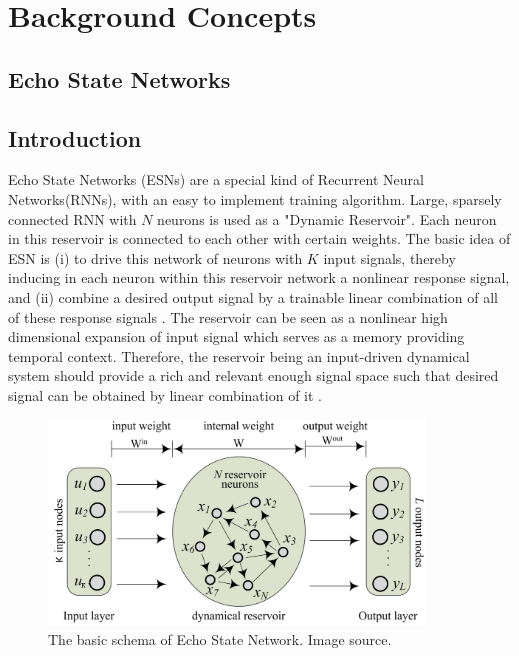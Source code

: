  \section{Background Concepts}
 
 \subsection{Echo State Networks}
  \subsection{Introduction}
  \indent \indent
  
 Echo State Networks (ESNs) are a special kind of Recurrent Neural Networks(RNNs), with an easy to implement training algorithm.
 Large, sparsely connected RNN with $N$ neurons is used as a "Dynamic Reservoir". 
 Each neuron in this reservoir is connected to each other with certain weights. The basic idea of ESN is (i) to drive this network of neurons with $K$ input signals, thereby inducing in each neuron within this reservoir network a nonlinear response signal, and (ii) combine a desired output signal by a trainable linear combination of all of these response signals \cite{Jaeger:2007}. %
 The reservoir can be seen as a nonlinear high dimensional expansion of input signal which serves as a memory providing temporal context. Therefore, the reservoir being an input-driven dynamical system should provide a rich and relevant enough signal space such that desired signal can be obtained by linear combination of it \cite{mantas}.
 \\
 \begin{figure}
	 \centering
	 \includegraphics[width = 10cm]{./backgroundConcepts/images/esn1}
	 \caption{The basic schema of Echo State Network. Image source\cite{Li_2015}.}
  \end{figure}
 
